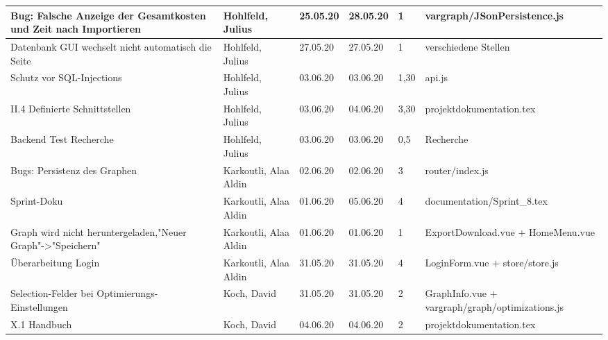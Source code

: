 \begin{longtable}{|p{4cm}|p{2cm}|p{1.2cm}|p{1.2cm}|p{0.7cm}|p{6.3cm}|}
  Bug: Falsche Anzeige der Gesamtkosten und Zeit nach Importieren       & Hohlfeld, Julius      & 25.05.20 & 28.05.20 & 1     & vargraph/JSonPersistence.js                                                    \\ \hline         
  Datenbank GUI wechselt nicht automatisch die Seite                    & Hohlfeld, Julius      & 27.05.20 & 27.05.20 & 1     & verschiedene Stellen                                          \\ \hline
  Schutz vor SQL-Injections                                             & Hohlfeld, Julius      & 03.06.20 & 03.06.20 & 1,30  & api.js                                                      \\ \hline
  II.4 Definierte Schnittstellen                                        & Hohlfeld, Julius      & 03.06.20 & 04.06.20 & 3,30  & projektdokumentation.tex                                                      \\ \hline
  Backend Test Recherche                                                & Hohlfeld, Julius      & 03.06.20 & 03.06.20 & 0,5   & Recherche                                                    \\ \hline

  Bugs: Persistenz des Graphen                                           & Karkoutli, Alaa Aldin & 02.06.20 & 02.06.20 & 3     & router/index.js                                              \\ \hline
  Sprint-Doku                                                           & Karkoutli, Alaa Aldin & 01.06.20 & 05.06.20 & 4     & documentation/Sprint\_8.tex                                            \\ \hline
  Graph wird nicht heruntergeladen,"Neuer Graph"->"Speichern"           & Karkoutli, Alaa Aldin & 01.06.20 & 01.06.20 & 1     & ExportDownload.vue $+$ HomeMenu.vue                                          \\ \hline
  Überarbeitung Login                                                   & Karkoutli, Alaa Aldin & 31.05.20 & 31.05.20 & 4     & LoginForm.vue $+$ store/store.js                                          \\ \hline
  
  
  Selection-Felder bei Optimierungs-Einstellungen                       & Koch, David           & 31.05.20 & 31.05.20 & 2     & GraphInfo.vue $+$ vargraph/graph/optimizations.js                                                   \\ \hline
  X.1 Handbuch                                                          & Koch, David           & 04.06.20 & 04.06.20 & 2     & projektdokumentation.tex                                         
\\ \hline
\end{longtable}

